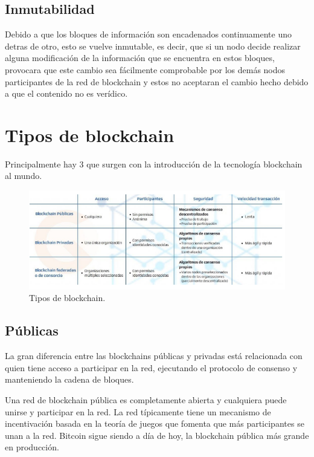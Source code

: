 \documentclass[conference]{IEEEtran}
\begin{document}
\subsection{Inmutabilidad}

Debido a que los bloques de información son encadenados continuamente uno detras de otro, esto se vuelve inmutable, es decir, que si un nodo decide realizar alguna modificación de la información que se encuentra en estos bloques, provocara que este cambio sea fácilmente comprobable por los demás nodos participantes de la red de blockchain y estos no aceptaran el cambio hecho debido a que el contenido no es verídico.

\section{Tipos de blockchain}

Principalmente hay 3 que surgen con la introducción de la tecnología blockchain al mundo.

\begin{figure}[htbp]
    \centering
    \includegraphics[scale=.4]{assets/images/tipos.png}
    \caption{Tipos de blockchain.}
\end{figure}

\subsection{Públicas}

La gran diferencia entre las blockchains públicas y privadas está relacionada con quien tiene acceso a participar en la red, ejecutando el protocolo de consenso y manteniendo la cadena de bloques.

Una red de blockchain pública es completamente abierta y cualquiera puede unirse y participar en la red. La red típicamente tiene un mecanismo de incentivación basada en la teoría de juegos que fomenta que más participantes se unan a la red. Bitcoin sigue siendo a día de hoy, la blockchain pública más grande en producción.
\end{document}
